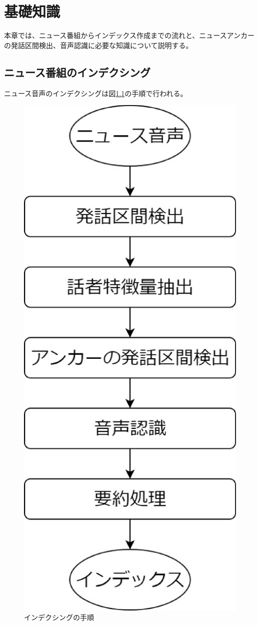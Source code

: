 \chapter{基礎知識}
本章では、ニュース番組からインデックス作成までの流れと、ニュースアンカーの発話区間検出、音声認識に必要な知識について説明する。
\section{ニュース番組のインデクシング}\cite{indexing_flow}
ニュース音声のインデクシングは図\ref{fig:indexing}の手順で行われる。

\begin{figure}[H]
  \begin{center}
    \includegraphics[scale=0.3]{./figure/indexing.eps}
  \end{center}
  \caption{インデクシングの手順 \label{fig:indexing}}
\end{figure}

